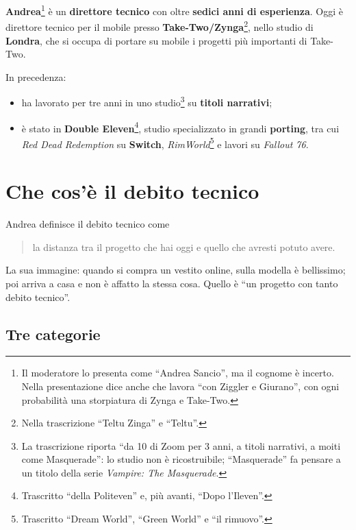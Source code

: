 \textbf{Andrea}\footnote{Il moderatore lo presenta come ``Andrea Sancio'', ma il
cognome è incerto. Nella presentazione dice anche che lavora ``con Ziggler e
Giurano'', con ogni probabilità una storpiatura di Zynga e Take-Two.} è un
\textbf{direttore tecnico} con oltre \textbf{sedici anni di esperienza}. Oggi è
direttore tecnico per il mobile presso \textbf{Take-Two/Zynga}\footnote{Nella
trascrizione ``Teltu Zinga'' e ``Teltu''.}, nello studio di \textbf{Londra}, che si
occupa di portare su mobile i progetti più importanti di Take-Two.

In precedenza:
\begin{itemize}
  \item ha lavorato per tre anni in uno studio\footnote{La trascrizione riporta
        ``da 10 di Zoom per 3 anni, a titoli narrativi, a moiti come
        Masquerade'': lo studio non è ricostruibile; ``Masquerade'' fa pensare a un
        titolo della serie \emph{Vampire: The Masquerade}.} su \textbf{titoli
        narrativi};
  \item è stato in \textbf{Double Eleven}\footnote{Trascritto ``della
        Politeven'' e, più avanti, ``Dopo l'Ileven''.}, studio specializzato in
        grandi \textbf{porting}, tra cui \emph{Red Dead Redemption} su
        \textbf{Switch}, \emph{RimWorld}\footnote{Trascritto ``Dream World'',
        ``Green World'' e ``il rimuovo''.} e lavori su \emph{Fallout 76}.
\end{itemize}

\section{Che cos'è il debito tecnico}
\label{sec:c3-2-definizione}

Andrea definisce il debito tecnico come
\begin{quote}
la distanza tra il progetto che hai oggi e quello che avresti potuto avere.
\end{quote}
La sua immagine: quando si compra un vestito online, sulla modella è bellissimo;
poi arriva a casa e non è affatto la stessa cosa. Quello è ``un progetto con tanto
debito tecnico''.

\subsection{Tre categorie}

